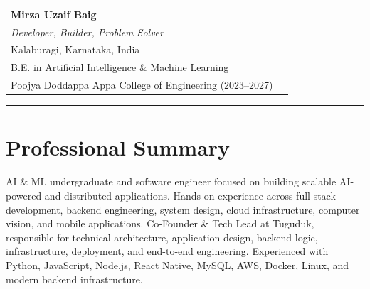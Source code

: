 \documentclass[10pt]{article}
\newcommand{\greyhref}[2]{%
\href{#1}{\colorbox{gray!15}{\textcolor{black}{\strut #2}}}%
}
\begin{document}

\begin{center}
\begin{tabularx}{\textwidth}{X r}

\textbf{\LARGE Mirza Uzaif Baig} 
& \greyhref{tel:+919449619175}{\footnotesize \faPhone\ +91 94496 19175} \\[3pt]

\textit{Developer, Builder, Problem Solver}
& \greyhref{mailto:mirzauzaif07@gmail.com}{\footnotesize \faEnvelope\ mirzauzaif07@gmail.com} \\[3pt]

Kalaburagi, Karnataka, India 
& \greyhref{https://www.linkedin.com/in/mirza-uzaif-baig/}{\footnotesize \faLinkedin\ Mirza-Uzaif-Baig} \\

B.E. in Artificial Intelligence \& Machine Learning 
& \greyhref{https://github.com/uzzzaif}{\footnotesize \faGithub\ uzzzaif} \\[3pt]

Poojya Doddappa Appa College of Engineering (2023--2027)
& \greyhref{https://uzzzaif.me}{\footnotesize \faGlobe\ uzzzaif.me} \\[3pt]

\end{tabularx}

\end{center}

\vspace{5pt}
\hrule


\section{Professional Summary}

AI \& ML undergraduate and software engineer focused on building scalable AI-powered and distributed applications. Hands-on experience across full-stack development, backend engineering, system design, cloud infrastructure, computer vision, and mobile applications. Co-Founder \& Tech Lead at Tuguduk, responsible for technical architecture, application design, backend logic, infrastructure, deployment, and end-to-end engineering. Experienced with Python, JavaScript, Node.js, React Native, MySQL, AWS, Docker, Linux, and modern backend infrastructure.

\end{document}
